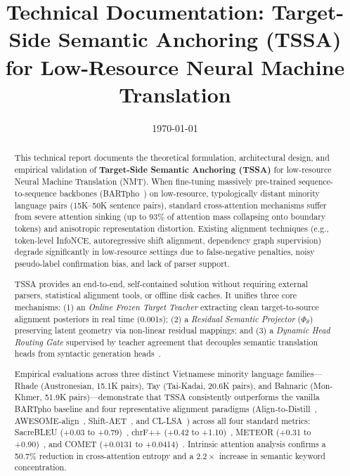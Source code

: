 \documentclass[11pt,a4paper]{article}
\title{\textbf{Technical Documentation: Target-Side Semantic Anchoring (TSSA) for Low-Resource Neural Machine Translation}}
\author{}
\date{\today}
\begin{document}
\maketitle

\begin{abstract}
This technical report documents the theoretical formulation, architectural design, and empirical validation of \textbf{Target-Side Semantic Anchoring (TSSA)} for low-resource Neural Machine Translation (NMT). When fine-tuning massively pre-trained sequence-to-sequence backbones (BARTpho~\cite{tran2021bartpho}) on low-resource, typologically distant minority language pairs (15K--50K sentence pairs), standard cross-attention mechanisms suffer from severe attention sinking (up to 93\% of attention mass collapsing onto boundary tokens) and anisotropic representation distortion. Existing alignment techniques (e.g., token-level InfoNCE, autoregressive shift alignment, dependency graph supervision) degrade significantly in low-resource settings due to false-negative penalties, noisy pseudo-label confirmation bias, and lack of parser support.

TSSA provides an end-to-end, self-contained solution without requiring external parsers, statistical alignment tools, or offline disk caches. It unifies three core mechanisms: (1) an \textit{Online Frozen Target Teacher} extracting clean target-to-source alignment posteriors in real time (0.001s); (2) a \textit{Residual Semantic Projector} ($\Phi_\theta$) preserving latent geometry via non-linear residual mappings; and (3) a \textit{Dynamic Head Routing Gate} supervised by teacher agreement that decouples semantic translation heads from syntactic generation heads~\cite{voita2019analyzing}. 

Empirical evaluations across three distinct Vietnamese minority language families---Rhade (Austronesian, 15.1K pairs), Tay (Tai-Kadai, 20.6K pairs), and Bahnaric (Mon-Khmer, 51.9K pairs)---demonstrate that TSSA consistently outperforms the vanilla BARTpho baseline and four representative alignment paradigms (Align-to-Distill~\cite{jin2024align}, AWESOME-align~\cite{dou2021word}, Shift-AET~\cite{chen2020accurate}, and CL-LSA~\cite{chi2021infoxlm}) across all four standard metrics: SacreBLEU (+0.03 to +0.79)~\cite{post2018call}, chrF++ (+0.42 to +1.10)~\cite{popovic2015chrf}, METEOR (+0.31 to +0.90)~\cite{banerjee2005meteor}, and COMET (+0.0131 to +0.0414)~\cite{rei2020comet}. Intrinsic attention analysis confirms a 50.7\% reduction in cross-attention entropy and a $2.2\times$ increase in semantic keyword concentration.
\end{abstract}
\end{document}
